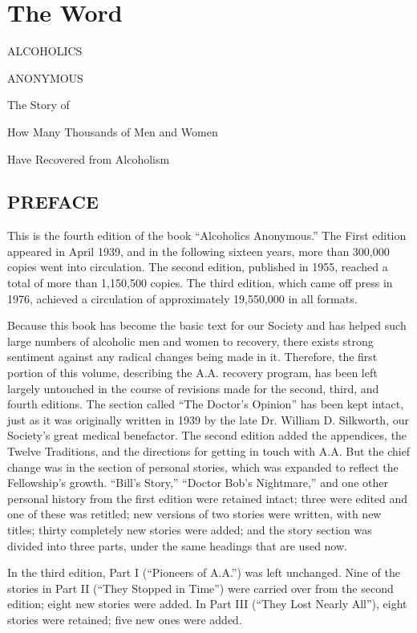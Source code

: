 
\section{The Word}


ALCOHOLICS 


ANONYMOUS


The Story of


How Many Thousands of Men and Women


Have Recovered from Alcoholism


\subsection{PREFACE}

This is the fourth edition of the book “Alcoholics Anonymous.”
The First edition appeared in April 1939, and in the following sixteen years, more than 300,000 copies went into circulation.
The second edition, published in 1955, reached a total of more than 1,150,500 copies.
The third edition, which came off press in 1976, achieved a circulation of approximately 19,550,000 in all formats.

Because this book has become the basic text for our Society and has helped such large numbers of alcoholic men and women to recovery, there exists strong sentiment against any radical changes being made in it.
Therefore, the ﬁrst portion of this volume, describing the A.A. recovery program, has been left largely untouched in the course of revisions made for the second, third, and fourth editions.
The section called “The Doctor’s Opinion” has been kept intact, just as it was originally written in 1939 by the late Dr. William D. Silkworth, our Society’s great medical benefactor.
The second edition added the appendices, the Twelve Traditions, and the directions for getting in touch with A.A.
But the chief change was in the section of personal stories, which was expanded to reflect the Fellowship’s growth.
“Bill’s Story,” “Doctor Bob’s Nightmare,” and one other personal history from the first edition were retained intact; 
three were edited and one of these was retitled; 
new versions of two stories were written, with new titles; 
thirty completely new stories were added; 
and the story section was divided into three parts, under the same headings that are used now.

In the third edition, Part I (“Pioneers of A.A.”) was left unchanged.
Nine of the stories in Part II (“They Stopped in Time”) were carried over from the second edition; 
eight new stories were added.
In Part III (“They Lost Nearly All”), eight stories were retained; five new ones were added. 

